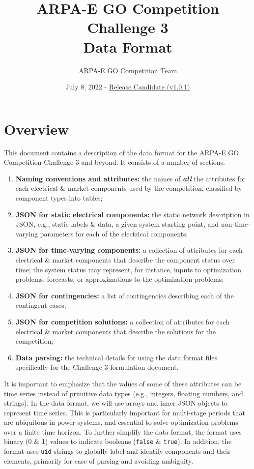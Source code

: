 \documentclass{article}
\title{ARPA-E GO Competition Challenge 3 \\ Data Format}
\author{ARPA-E GO Competition Team}
\date{July 8, 2022 - \underline{Release Candidate (v1.0.1)}}
\begin{document}
\maketitle





\section{Overview}

This document contains a description of the data format for the ARPA-E GO Competition Challenge 3 and beyond. It consists of a number of sections.
\begin{enumerate}[I]
    \item {\bf Naming conventions and attributes:} the names of \textit{\textbf{all}} the attributes for each electrical \& market components used by the competition, classified by component types into tables;

    \item {\bf JSON for static electrical components:} the static network description in JSON, e.g., static labels \& data, a given system starting point, and non-time-varying parameters for each of the electrical components;

    \item {\bf JSON for time-varying components:} a collection of attributes for each electrical \& market components that describe the component status over time; the system status may represent, for instance, inputs to optimization problems,  forecasts, or approximations to the optimization problems;
    \item {\bf JSON for contingencies:} a list of contingencies describing each of the contingent cases;
    \item {\bf JSON for competition solutions:} a collection of attributes for each electrical \& market components that describe the solutions for the competition;
     \item {\bf Data parsing:}
     the technical details for using the data format files specifically for the Challenge 3 formulation document.
\end{enumerate}
It is important to emphasize that the values of some of these attributes can be time series instead of primitive data types (e.g., integers, floating numbers, and strings).
In the data format, we will use arrays and inner JSON objects to represent time series.
This is particularly important for multi-stage periods that are ubiquitous in power systems, and essential
to solve optimization problems over a finite time horizon.
To further simplify the data format, the format uses binary (0 \& 1) values to indicate booleans (\texttt{false} \& \texttt{true}).
In addition, the format uses \texttt{uid} strings to globally label and identify components and their elements, primarily for ease of parsing and avoiding ambiguity. 
\end{document}
